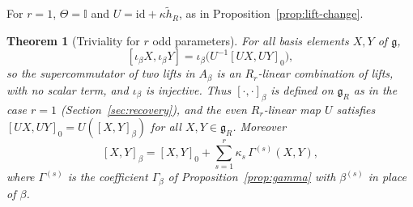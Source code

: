 \documentclass[11pt]{article}
\numberwithin{equation}{section}
\newtheorem{theorem}{Theorem}[section]
\theoremstyle{definition}
\theoremstyle{remark}
\begin{document}
For $r=1$, $\Theta=\mathbb I$ and $U=\mathrm{id}+\kappa\tilde h_R$, as in Proposition~\ref{prop:lift-change}.

\begin{theorem}[Triviality for $r$ odd parameters]\label{thm:multi}
For all basis elements $X,Y$ of $\mathfrak g$,
\[
 [\iota_\beta X,\iota_\beta Y]=\iota_\beta\bigl(U^{-1}[UX,UY]_0\bigr),
\]
so the supercommutator of two lifts in $A_\beta$ is an $R_r$-linear combination of lifts, with no
scalar term, and $\iota_\beta$ is injective. Thus
$[\cdot,\cdot]_\beta$ is defined on $\mathfrak g_R$ as in the case $r=1$ (Section~\ref{sec:recovery}), and the even $R_r$-linear map $U$ satisfies
$[UX,UY]_0=U([X,Y]_\beta)$ for all $X,Y\in\mathfrak g_R$.
Moreover
\begin{equation}\label{eq:linear}
 [X,Y]_\beta=[X,Y]_0+\sum_{s=1}^r\kappa_s\,\Gamma^{(s)}(X,Y),
\end{equation}
where $\Gamma^{(s)}$ is the coefficient $\Gamma_\beta$ of Proposition~\ref{prop:gamma}
with $\beta^{(s)}$ in place of $\beta$.
\end{theorem}
\end{document}
